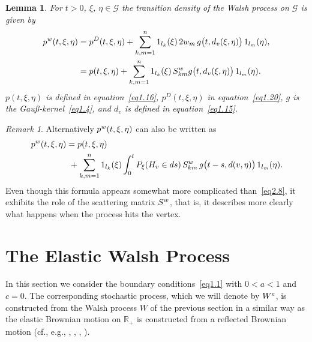 \documentclass[11pt,a4paper]{amsart}
\newcommand{\cG}{\mathcal{G}}
\newcommand{\1}{1}
\newcommand{\R}{\mathbb{R}}
\newtheorem{lemma}[theorem]{Lemma}
\theoremstyle{remark}
\newtheorem{remark}[theorem]{Remark}
\newcommand{\onel}[1][k]{\ensuremath1_{l_{#1}}}
\newcommand{\pW}{\ensuremath p^w}
\newcommand{\SW}{\ensuremath S^w}
\newcommand{\We}{\ensuremath W^e}
\numberwithin{equation}{section}
\begin{document}
\begin{lemma}   \label{lem2.5}
For $t>0$, $\xi$, $\eta\in\cG$ the transition density of the Walsh process on $\cG$ is
given by
\begin{align}
    \pW(t,\xi,\eta)
        &= p^D(t,\xi,\eta) + \sum_{k,m=1}^n \onel(\xi)\,
                2w_m\, g\bigl(t,d_v(\xi,\eta)\bigr)\,\onel[m](\eta), \label{eq2.7}\\
        &= p(t,\xi,\eta) + \sum_{k,m=1}^n \onel(\xi)\,
                \SW_{km} g\bigl(t,d_v(\xi,\eta)\bigr)\,\onel[m](\eta). \label{eq2.8}
\end{align}
$p(t,\xi,\eta)$ is defined in equation~\eqref{eq1.16}, $p^D(t,\xi,\eta)$ in
equation~\eqref{eq1.20}, $g$ is the Gau{\ss}-kernel~\eqref{eq1.4}, and $d_v$ is
defined in equation~\eqref{eq1.15}.
\end{lemma}

\begin{remark}  \label{rem2.6}
Alternatively $\pW(t,\xi,\eta)$ can also be written as
\begin{equation}    \label{eq2.9}
\begin{split}
    \pW(t,\xi,\eta)
        &= p(t,\xi,\eta)\\
        &\  + \sum_{k,m=1}^n \onel(\xi)
            \int_0^t P_\xi(H_v\in ds)\, \SW_{km}\, g\bigl(t-s,d(v,\eta)\bigr)\,\onel[m](\eta).
\end{split}
\end{equation}
Even though this formula appears somewhat more complicated than~\eqref{eq2.8}, it
exhibits the role of the scattering matrix $\SW$, that is, it describes more clearly what
happens when the process hits the vertex.
\end{remark}

\section{The Elastic Walsh Process} \label{sect3}
In this section we consider the boundary conditions~\eqref{eq1.1} with $0<a<1$ and
$c=0$. The corresponding stochastic process, which we will denote by $\We$, is constructed
from the Walsh process $W$ of the previous section in a similar way as the elastic Brownian
motion on $\R_+$ is constructed from a reflected Brownian motion (cf., e.g., \cite{ItMc63},
\cite[Chapter~2.3]{ItMc74}, \cite[Chapter~6.2]{Kn81}, \cite[Chapter~6.4]{KaSh91}).
\end{document}
